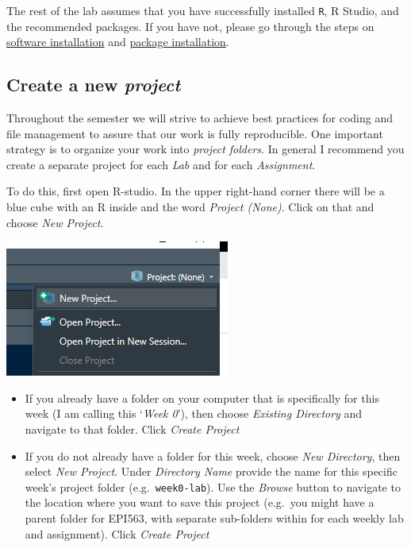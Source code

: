 \documentclass[
]{book}
\providecommand{\tightlist}{%
  \setlength{\itemsep}{0pt}\setlength{\parskip}{0pt}}
\begin{document}
The rest of the lab assumes that you have successfully installed \texttt{R}, R Studio, and the recommended packages. If you have not, please go through the steps on \href{https://mkram01.github.io/EPI563-SpatialEPI/software-installation.html}{software installation} and \href{https://mkram01.github.io/EPI563-SpatialEPI/installing-packages-for-this-course.html}{package installation}.

\hypertarget{create-a-new-project}{%
\subsection{\texorpdfstring{Create a new \emph{project}}{Create a new project}}\label{create-a-new-project}}

Throughout the semester we will strive to achieve best practices for coding and file management to assure that our work is fully reproducible. One important strategy is to organize your work into \emph{project folders}. In general I recommend you create a separate project for each \emph{Lab} and for each \emph{Assignment}.

To do this, first open R-studio. In the upper right-hand corner there will be a blue cube with an R inside and the word \emph{Project (None)}. Click on that and choose \emph{New Project}.

\begin{center}\includegraphics[width=1.2\linewidth]{images/new-project} \end{center}

\begin{itemize}
\tightlist
\item
  If you already have a folder on your computer that is specifically for this week (I am calling this `\emph{Week 0}'), then choose \emph{Existing Directory} and navigate to that folder. Click \emph{Create Project}
\item
  If you do not already have a folder for this week, choose \emph{New Directory}, then select \emph{New Project}. Under \emph{Directory Name} provide the name for this specific week's project folder (e.g.~\texttt{week0-lab}). Use the \emph{Browse} button to navigate to the location where you want to save this project (e.g.~you might have a parent folder for EPI563, with separate sub-folders within for each weekly lab and assignment). Click \emph{Create Project}
\end{itemize}
\end{document}
